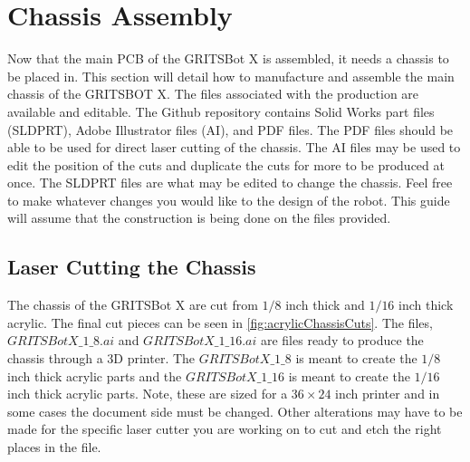 \section{Chassis Assembly}
\label{sec:chassis}

Now that the main PCB of the GRITSBot X is assembled, it needs a chassis to be placed in. This section will detail how to manufacture and assemble the main chassis of the GRITSBOT X. The files associated with the production are available and editable. The Github repository contains Solid Works part files (SLDPRT), Adobe Illustrator files (AI), and PDF files. The PDF files should be able to be used for direct laser cutting of the chassis. The AI files may be used to edit the position of the cuts and duplicate the cuts for more to be produced at once. The SLDPRT files are what may be edited to change the chassis. Feel free to make whatever changes you would like to the design of the robot. This guide will assume that the construction is being done on the files provided.

\subsection{Laser Cutting the Chassis}
\label{sec:laserCut}

The chassis of the GRITSBot X are cut from $1/8$ inch thick and $1/16$ inch thick acrylic. The final cut pieces can be seen in \cref{fig:acrylicChassisCuts}. The files, \texttt{$GRITSBotX\_1\_8.ai$} and \texttt{$GRITSBotX\_1\_16.ai$} are files ready to produce the chassis through a 3D printer. The \texttt{$GRITSBotX\_1\_8$} is meant to create the $1/8$ inch thick acrylic parts and the \texttt{$GRITSBotX\_1\_16$} is meant to create the $1/16$ inch thick acrylic parts. {\color{red}Note}, these are sized for a $36 \times 24$ inch printer and in some cases the document side must be changed. Other alterations may have to be made for the specific laser cutter you are working on to cut and etch the right places in the file.

